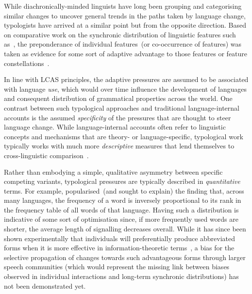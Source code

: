 While diachronically-minded linguists have long been grouping and categorising similar changes to uncover general trends in the paths taken by language change, typologists have arrived at a similar point but from the opposite direction. Based on comparative work on the synchronic distribution of linguistic features such as~\citet{Greenberg1963}, the preponderance of individual features~(or co-occurrence of features) was taken as evidence for some sort of adaptive advantage to those features or feature constellations~\citep{Jaeger2010}.

In line with LCAS principles, the adaptive pressures are assumed to be associated with language \emph{use}, which would over time influence the development of languages and consequent distribution of grammatical properties across the world.
One contrast between such typological approaches and traditional language-internal accounts is the assumed \emph{specificity} of the pressures that are thought to steer language change. While language-internal accounts often refer to linguistic concepts and mechanisms that are theory- or language-specific, typological work typically works with much more \emph{descriptive} measures that lend themselves to cross-linguistic comparison~\citep{Haspelmath2010}.

Rather than embodying a simple, qualitative asymmetry between specific competing variants, typological pressures are typically described in \emph{quantitative} terms. 
For example, \citet{Zipf1935,Zipf1949} popularised~(and sought to explain) the finding that, across many languages, the frequency of a word is inversely proportional to its rank in the frequency table of all words of that language.
Having such a distribution is indicative of some sort of optimisation since, if more frequently used words are shorter, the average length of signalling decreases overall. While it has since been shown experimentally that individuals will preferentially produce abbreviated forms when it is more effective in information-theoretic terms~\citep{Mahowald2013,Kanwal2017}, a bias for the selective propagation of changes towards such advantageous forms through larger speech communities (which would represent the missing link between biases observed in individual interactions and long-term synchronic distributions) has not been demonstrated yet.

